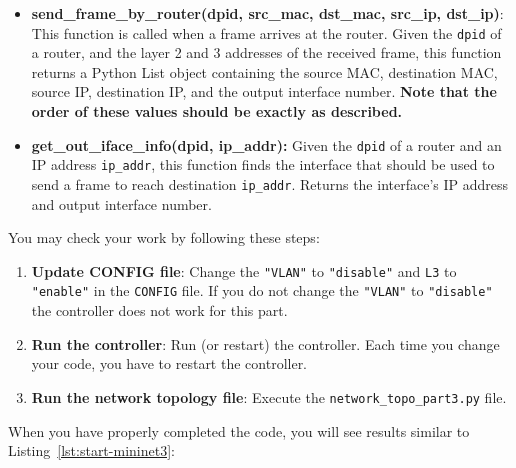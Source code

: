 \documentclass[11pt]{article}
\begin{document}
\begin{itemize}
    \item \textbf{send\_frame\_by\_router(dpid, src\_mac, dst\_mac, src\_ip, dst\_ip)}: This function is called when a frame arrives at the router. Given the \texttt{dpid} of a router, and the layer 2 and 3 addresses of the received frame, this function returns a Python List object containing the source MAC, destination MAC, source IP, destination IP, and the output interface number. \textbf{Note that the order of these values should be exactly as described.}

    \item \textbf{get\_out\_iface\_info(dpid, ip\_addr):} Given the \texttt{dpid} of a router and an IP address \texttt{ip\_addr}, this function finds the interface that should be used to send a frame to reach destination \texttt{ip\_addr}. Returns the interface's IP address and output interface number.
\end{itemize}


You may check your work by following these steps:
\begin{enumerate}
    \item \textbf{Update CONFIG file}: Change the \texttt{"VLAN"} to \texttt{"disable"} and \texttt{L3} to \texttt{"enable"} in the \texttt{CONFIG} file. If you do not change the \texttt{"VLAN"} to \texttt{"disable"} the controller does not work for this part.
    \item \textbf{Run the controller}: Run (or restart) the controller. Each time you change your code, you have to restart the controller.
    \item \textbf{Run the network topology file}: Execute the \texttt{network\_topo\_part3.py} file.
\end{enumerate}

When you have properly completed the code, you will see results similar to Listing~\ref{lst:start-mininet3}:
\end{document}
